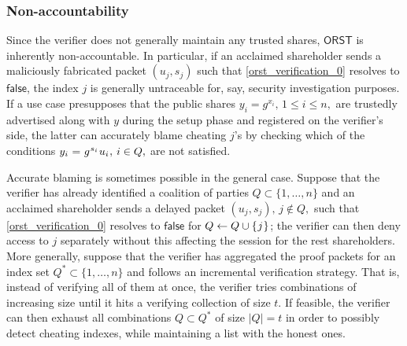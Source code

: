 \documentclass{iacrtrans}
\begin{document}
\subsubsection{Non-accountability}\label{section_non_accountability}
Since the verifier does not generally
maintain any trusted shares,
$\mathsf{ORST}$ is inherently non-accountable.
In particular, if an acclaimed shareholder sends
a maliciously fabricated packet $(u_j, s_j)$
such that \eqref{orst_verification_0}
resolves to $\mathsf{false}$, the index $j$
is generally untraceable
for, say, security investigation purposes.
If a use case presupposes that the
public shares $y_i=g^{x_i},\hspace{2pt} 1 \le i \le n,$
are trustedly advertised along with $y$ during the setup phase
and registered on the verifier's side,
the latter can accurately blame cheating $j$'s by
checking which of the conditions
$
y_i \hspace{0.5pt}
=
\hspace{0.5pt}
g^{\hspace{0.5pt}s_i}\hspace{0.5pt} u_i\hspace{0.5pt},
\hspace{2pt} i \in Q,
$
are not satisfied.

Accurate blaming is sometimes possible in the general case.
Suppose that the verifier has already
identified a coalition of parties
$Q \subset \{1, \dots, n\}$
and an acclaimed shareholder sends a delayed packet
$(u_j, s_j),\hspace{2pt} j \not \in Q,$ such that
\eqref{orst_verification_0}
resolves to $\mathsf{false}$
for $Q \leftarrow Q \cup \{\hspace{0.5pt}j\hspace{0.5pt}\}$;
the verifier can then deny access to $j$ separately
without this affecting the session for the rest shareholders.
More generally, suppose that the verifier has aggregated
the proof packets for an index set $Q^* \subset \{1, \dots, n\}$
and follows an incremental verification strategy.
That is, instead of verifying all of them at once,
the verifier tries combinations of increasing size until
it hits a verifying collection of size $t$.
If feasible, the verifier can then exhaust all combinations
$Q \subset Q^*$ of size $|Q| = t$ in order
to possibly detect cheating indexes, while maintaining a list
with the honest ones.
\end{document}
